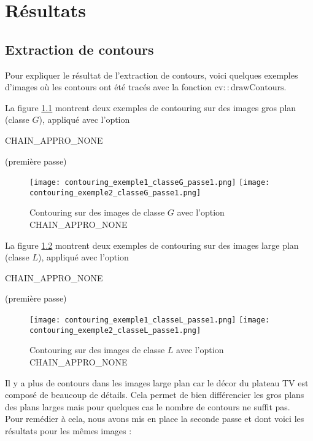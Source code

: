 \documentclass{book}
\begin{document}
\chapter{Résultats}
\section{Extraction de contours}
Pour expliquer le résultat de l’extraction de contours, voici quelques exemples d'images où les contours ont été tracés avec 
la fonction $\mathrm{cv::drawContours}$.

La figure \ref{contouringG1} montrent deux exemples de contouring sur des images \og gros plan \fg{} (classe $G$), appliqué
avec l'option \begin{itshape}CHAIN\_APPRO\_NONE\end{itshape} (première passe)

\begin{figure}[H]
\begin{center}
\texttt{[image: contouring\_exemple1\_classeG\_passe1.png]}
\texttt{[image: contouring\_exemple2\_classeG\_passe1.png]}
\end{center}
\caption{Contouring sur des images de classe $G$ avec l'option CHAIN\_APPRO\_NONE}
\label{contouringG1}
\end{figure}

La figure \ref{contouringL1} montrent deux exemples de contouring sur des images \og large plan \fg{} (classe $L$), appliqué
avec l'option \begin{itshape}CHAIN\_APPRO\_NONE\end{itshape} (première passe)

\begin{figure}[H]
\begin{center}
\texttt{[image: contouring\_exemple1\_classeL\_passe1.png]}
\texttt{[image: contouring\_exemple2\_classeL\_passe1.png]}
\end{center}
\caption{Contouring sur des images de classe $L$ avec l'option CHAIN\_APPRO\_NONE}
\label{contouringL1}
\end{figure}

Il y a plus de contours dans les images \og large plan \fg{} car le décor du plateau TV est composé de beaucoup de détails.
Cela permet de bien différencier les gros plans des plans larges mais pour quelques cas le nombre de 
contours ne suffit pas.\\
Pour remédier à cela, nous avons mis en place la seconde passe et dont voici les résultats pour les mêmes 
images : 
\end{document}
